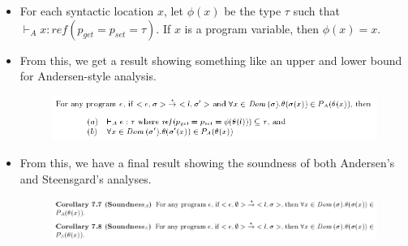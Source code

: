 \documentclass{beamer}
\begin{document}
\begin{frame}[allowframebreaks]
  \framebreak

  \begin{itemize}
  \item For each syntactic location $x$, let $\phi(x)$ be the type
    $\tau$ such that $\vdash_A x: ref(p_{get} = p_{set} =
    \tau)$. If $x$ is a program variable, then $\phi(x) = x$.
  \item From this, we get a result showing something like an upper and
    lower bound for Andersen-style analysis.
    \begin{figure}
      \centering
      \includegraphics[scale=0.3]{theorem_7_6.png}
    \end{figure}
  \item From this, we have a final result showing the soundness of
    both Andersen's and Steensgard's analyses.
    \begin{figure}
      \centering
      \includegraphics[scale=0.3]{corollary_7_7_and_7_8.png}
    \end{figure}

  \end{itemize}
\end{frame}
\end{document}
